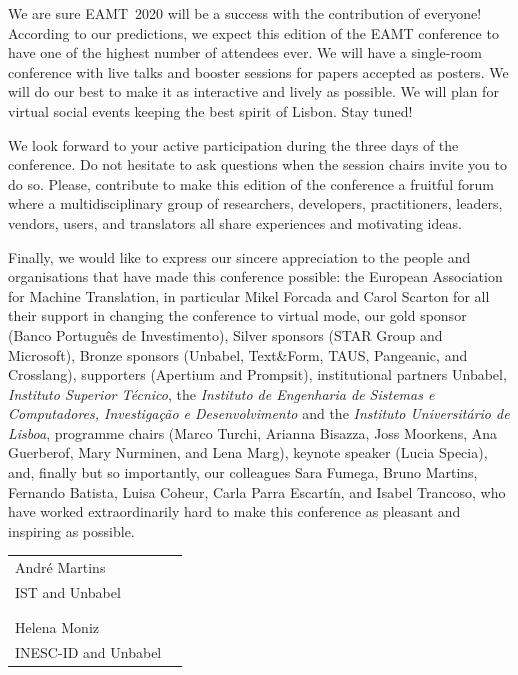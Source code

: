 \documentclass[a4paper,11pt,twoside]{book}
\begin{document}
We are sure EAMT~2020 will be a success with the contribution of everyone! According to our predictions, we expect this edition of the EAMT conference to have one of the highest number of attendees ever. We will have a single-room conference with live talks and booster sessions for papers accepted as posters. We will do our best to make it as interactive and lively as possible. We will plan for virtual social events keeping the best spirit of Lisbon. Stay tuned!

We look forward to your active participation during the three days of the conference. Do not hesitate to ask questions when the session chairs invite you to do so. Please, contribute to make this edition of the conference a fruitful forum where a multidisciplinary group of researchers, developers, practitioners, leaders, vendors, users, and translators all share experiences and motivating ideas.

Finally, we would like to express our sincere appreciation to the people and organisations that have made this conference possible: the European Association for Machine Translation, in particular Mikel Forcada and Carol Scarton for all their support in changing the conference to virtual mode, our gold sponsor (Banco Português de Investimento), Silver sponsors (STAR Group and Microsoft), Bronze sponsors (Unbabel, Text\&Form, TAUS, Pangeanic, and Crosslang), supporters (Apertium and Prompsit), institutional partners Unbabel, \emph{Instituto Superior Técnico}, the \emph{Instituto de Engenharia de Sistemas e Computadores, Investigação e Desenvolvimento} and the \emph{Instituto Universitário de Lisboa}, programme chairs (Marco Turchi, Arianna Bisazza, Joss Moorkens, Ana Guerberof, Mary Nurminen, and Lena Marg), keynote speaker (Lucia Specia), and, finally but so importantly, our colleagues Sara Fumega, Bruno Martins, Fernando Batista, Luisa Coheur, Carla Parra Escartín, and Isabel Trancoso, who have worked extraordinarily hard to make this conference as pleasant and inspiring as possible. 




\vspace{1cm}
\begin{center}
\begin{tabular}{ll}
André Martins\\
IST and Unbabel\\
\\
\\
Helena Moniz\\
INESC-ID and Unbabel\\
\end{tabular}
\end{center}
\end{document}
